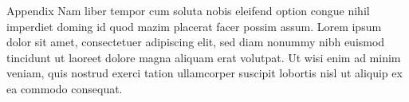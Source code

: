 \documentclass[aspectratio=1610,12pt]{beamer}
\begin{document}
\appendix
\begin{frame}{Appendix}
	Nam liber tempor cum soluta nobis eleifend option congue nihil imperdiet doming id quod mazim placerat facer possim assum. Lorem ipsum dolor sit amet, consectetuer adipiscing elit, sed diam nonummy nibh euismod tincidunt ut laoreet dolore magna aliquam erat volutpat. Ut wisi enim ad minim veniam, quis nostrud exerci tation ullamcorper suscipit lobortis nisl ut aliquip ex ea commodo consequat.
\end{frame}
\end{document}
